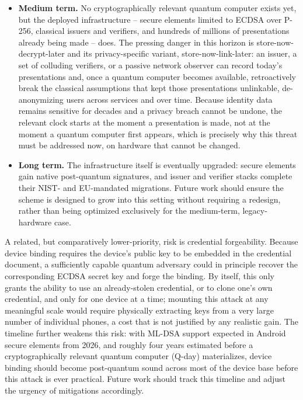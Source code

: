 \documentclass{article}
\begin{document}
\begin{itemize}
    \item \textbf{Medium term.} No cryptographically relevant quantum computer exists yet, but the deployed infrastructure -- secure elements limited to ECDSA over P-256, classical issuers and verifiers, and hundreds of millions of presentations already being made -- does. The pressing danger in this horizon is store-now-decrypt-later and its privacy-specific variant, store-now-link-later: an issuer, a set of colluding verifiers, or a passive network observer can record today's presentations and, once a quantum computer becomes available, retroactively break the classical assumptions that kept those presentations unlinkable, de-anonymizing users across services and over time. Because identity data remains sensitive for decades and a privacy breach cannot be undone, the relevant clock starts at the moment a presentation is made, not at the moment a quantum computer first appears, which is precisely why this threat must be addressed now, on hardware that cannot be changed.
    \item \textbf{Long term.} The infrastructure itself is eventually upgraded: secure elements gain native post-quantum signatures, and issuer and verifier stacks complete their NIST- and EU-mandated migrations. Future work should ensure the scheme is designed to grow into this setting without requiring a redesign, rather than being optimized exclusively for the medium-term, legacy-hardware case.
\end{itemize}

A related, but comparatively lower-priority, risk is credential forgeability. Because device binding requires the device's public key to be embedded in the credential document, a sufficiently capable quantum adversary could in principle recover the corresponding ECDSA secret key and forge the binding. By itself, this only grants the ability to use an already-stolen credential, or to clone one's own credential, and only for one device at a time; mounting this attack at any meaningful scale would require physically extracting keys from a very large number of individual phones, a cost that is not justified by any realistic gain. The timeline further weakens this risk: with ML-DSA support expected in Android secure elements from 2026, and roughly four years estimated before a cryptographically relevant quantum computer (Q-day) materializes, device binding should become post-quantum sound across most of the device base before this attack is ever practical. Future work should track this timeline and adjust the urgency of mitigations accordingly.
\end{document}
